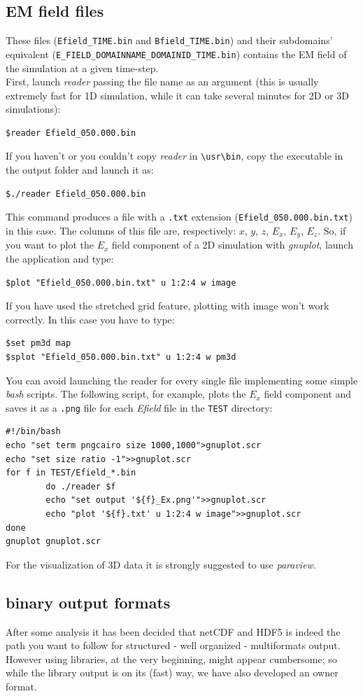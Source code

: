 \documentclass[11pt,a4paper]{report}
\begin{document}
\subsection{EM field files}
These files (\verb+Efield_TIME.bin+ and \verb+Bfield_TIME.bin+) and their subdomains' equivalent (\verb+E_FIELD_DOMAINNAME_DOMAINID_TIME.bin+) contains the EM field of the simulation at a given time-step.\\
First, launch \emph{reader} passing the file name as an argument (this is usually extremely fast for 1D simulation, while it can take several minutes for 2D or 3D simulations):
\begin{verbatim}
$reader Efield_050.000.bin
\end{verbatim}
If you haven't or you couldn't copy \emph{reader} in \verb+\usr\bin+, copy the executable in the output folder and launch it as:
\begin{verbatim}
$./reader Efield_050.000.bin
\end{verbatim}
This command produces a file with a \verb+.txt+ extension (\verb+Efield_050.000.bin.txt+) in this case. The columns of this file are, respectively: $x$, $y$, $z$, $E_x$, $E_y$, $E_z$. So, if you want to plot the $E_x$ field component of a 2D simulation with \emph{gnuplot}, launch the application and type:
\begin{verbatim}
$plot "Efield_050.000.bin.txt" u 1:2:4 w image
\end{verbatim}
If you have used the stretched grid feature, plotting with image won't work correctly. In this case you have to type:
\begin{verbatim}
$set pm3d map
$splot "Efield_050.000.bin.txt" u 1:2:4 w pm3d
\end{verbatim}
You can avoid launching the reader for every single file implementing some simple \emph{bash} scripts. The following script, for example, plots the 
$E_x$ field component and saves it as a \verb+.png+ file for each \emph{Efield} file in the \verb+TEST+ directory:
\begin{verbatim}
#!/bin/bash
echo "set term pngcairo size 1000,1000">gnuplot.scr
echo "set size ratio -1">>gnuplot.scr
for f in TEST/Efield_*.bin
        do ./reader $f
        echo "set output '${f}_Ex.png'">>gnuplot.scr
        echo "plot '${f}.txt' u 1:2:4 w image">>gnuplot.scr 
done
gnuplot gnuplot.scr
\end{verbatim}
For the visualization of 3D data it is strongly suggested to use \emph{paraview}.

\subsection{binary output formats}
After some analysis it has been decided that netCDF and HDF5 is indeed the path you want to follow for structured - well organized - multiformats output.
However using libraries, at the very beginning, might appear cumbersome; so while the library output is on its (fast) way, we have also developed an owner format.
\end{document}
